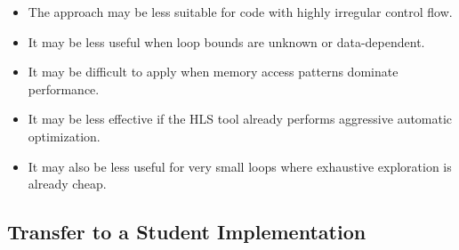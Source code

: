 \documentclass[conference]{IEEEtran}
\begin{document}
\begin{itemize}
    \item The approach may be less suitable for code with highly irregular control flow.
    \item It may be less useful when loop bounds are unknown or data-dependent.
    \item It may be difficult to apply when memory access patterns dominate performance.
    \item It may be less effective if the HLS tool already performs aggressive automatic optimization.
    \item It may also be less useful for very small loops where exhaustive exploration is already cheap.
\end{itemize}

\subsection{Transfer to a Student Implementation}
\end{document}
